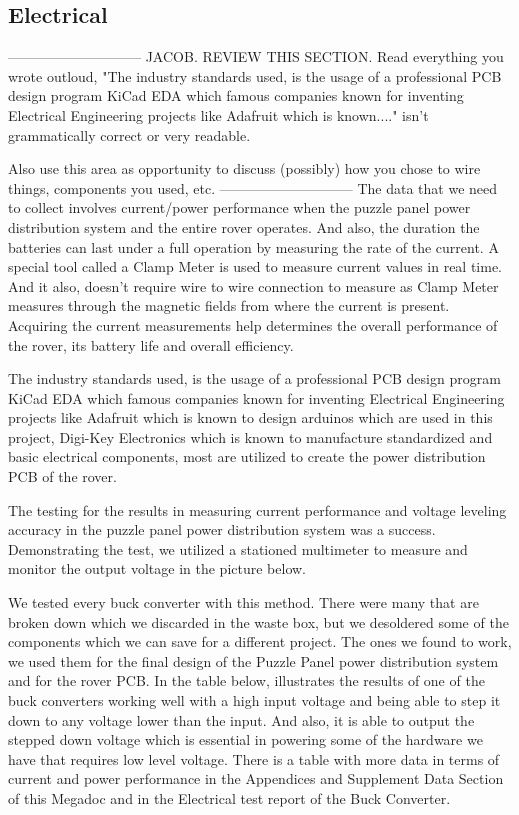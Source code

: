 \documentclass[a4paper, 10pt]{article}
\begin{document}
	\subsection{Electrical}
-----------------------------
JACOB. REVIEW THIS SECTION.	Read everything you wrote outloud, "The industry standards used, is the usage of a professional PCB design program KiCad EDA which famous companies known for inventing Electrical Engineering projects like Adafruit which is known...." isn't grammatically correct or very readable. 

Also use this area as opportunity to discuss (possibly) how you chose to wire things, components you used, etc.
-----------------------------
	The data that we need to collect involves current/power performance when the puzzle panel power distribution system and the entire rover operates. And also, the duration the batteries can last under a full operation by measuring the rate of the current. A special tool called a Clamp Meter is used to measure current values in real time. And it also, doesn't require wire to wire connection to measure as Clamp Meter measures through the magnetic fields from where the current is present. Acquiring the current measurements help determines the overall performance of the rover, its battery life and overall efficiency.

	The industry standards used, is the usage of a professional PCB design program KiCad EDA which famous companies known for inventing Electrical Engineering projects like Adafruit which is known to design arduinos which are used in this project, Digi-Key Electronics which is known to manufacture standardized and basic electrical components, most are utilized to create the power distribution PCB of the rover.

	The testing for the results in measuring current performance and voltage leveling accuracy in the puzzle panel power distribution system was a success. Demonstrating the test, we utilized a stationed multimeter to measure and monitor the output voltage in the picture below. 


	We tested every buck converter with this method. There were many that are broken down which we discarded in the waste box, but we desoldered some of the components which we can save for a different project. The ones we found to work, we used them for the final design of the Puzzle Panel power distribution system and for the rover PCB. In the table below, illustrates the results of one of the buck converters working well with a high input voltage and being able to step it down to any voltage lower than the input. And also, it is able to output the stepped down voltage which is essential in powering some of the hardware we have that requires low level voltage. There is a table with more data in terms of current and power performance in the Appendices and Supplement Data Section of this Megadoc and in the Electrical test report of the Buck Converter.
\end{document}
